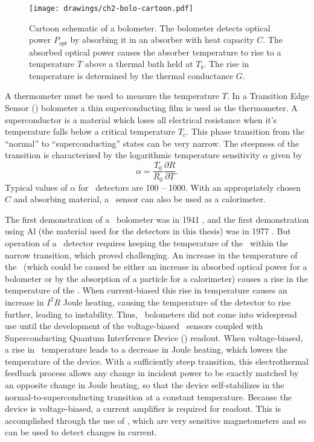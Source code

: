 \begin{figure*}
\centering
\texttt{[image: drawings/ch2-bolo-cartoon.pdf]}
\caption[Bolometer Schematic]{
  Cartoon schematic of a bolometer.
  The bolometer detects optical power $P_{opt}$ by absorbing it in an absorber with heat capacity $C$.
  The absorbed optical power causes the absorber temperature to rise to a temperature $T$ above a thermal bath held at $T_b$.
  The rise in temperature is determined by the thermal conductance $G$.
}
\label{fig:ch2-bolo-cartoon}
\end{figure*}

A thermometer must be used to measure the temperature $T$.
In a Transition Edge Sensor (\TES) bolometer a thin superconducting film is used as the thermometer.
A superconductor is a material which loses all electrical resistance when it's temperature falls below a critical temperature $T_c$.
This phase transition from the ``normal'' to ``superconducting'' states can be very narrow.
The steepness of the transition is characterized by the logarithmic temperature sensitivity $\alpha$ given by
\begin{equation}
  \alpha = \frac{T_0}{R_0} \frac{\partial R}{\partial T}.
\end{equation}
Typical values of $\alpha$ for \TES\ detectors are 100 -- 1000.
With an appropriately chosen $C$ and absorbing material, a \TES\ sensor can also be used as a calorimeter.

The first demonstration of a \TES\ bolometer was in 1941 \cite{andrews_attenuated_1942}, and the first demonstration using Al (the material used for the detectors in this thesis) was in 1977 \cite{clarke_superconductive_1977}.
But operation of a \TES\ detector requires keeping the temperature of the \TES\ within the narrow transition, which proved challenging.
An increase in the temperature of the \TES\ (which could be caused be either an increase in absorbed optical power for a bolometer or by the absorption of a particle for a calorimeter) causes a rise in the temperature of the \TES.
When current-biased this rise in temperature causes an increase in $I^2 R$ Joule heating, causing the temperature of the detector to rise further, leading to instability.
Thus, \TES\ bolometers did not come into widespread use until the development of the voltage-biased \TES\ sensors \cite{irwin_application_1995} coupled with Superconducting Quantum Interference Device (\SQUID) readout.
When voltage-biased, a rise in \TES\ temperature leads to a decrease in Joule heating, which lowers the temperature of the device.
With a sufficiently steep transition, this electrothermal feedback process allows any change in incident power to be exactly matched by an opposite change in Joule heating, so that the device self-stabilizes in the normal-to-superconducting transition at a constant temperature.
Because the device is voltage-biased, a current amplifier is required for readout.
This is accomplished through the use of \SQUIDs, which are very sensitive magnetometers and so can be used to detect changes in current.

